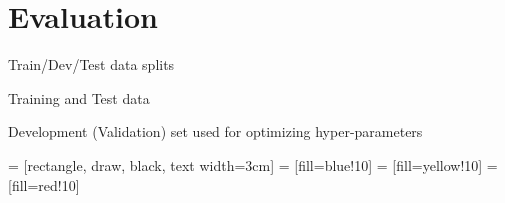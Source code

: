 \documentclass[12pt,aspectratio=169,handout]{beamer}
\begin{document}
\section{Evaluation}


\begin{frame}{ Train/Dev/Test data splits}

Training and Test data

Development (Validation) set used for optimizing hyper-parameters

 = [rectangle, draw, black, text width=3cm]
 = [fill=blue!10]
 = [fill=yellow!10]
 = [fill=red!10]

\begin{figure}


\end{figure}

\end{frame}
\end{document}
